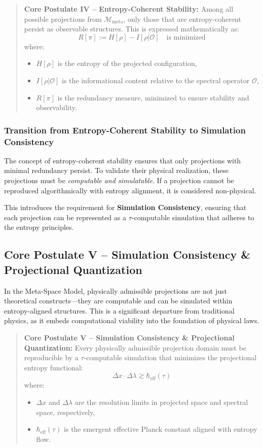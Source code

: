 \documentclass[10.5pt,a4paper]{article}
\begin{document}
\begin{quote}
\textbf{Core Postulate IV – Entropy-Coherent Stability:}  
Among all possible projections from \(\mathcal{M}_{\text{meta}}\), only those that are entropy-coherent persist as observable structures. This is expressed mathematically as:
\[
R[\pi] := H[\rho] - I[\rho | \mathcal{O}] \quad \text{is minimized}
\]
where:
\begin{itemize}
    \item \(H[\rho]\) is the entropy of the projected configuration,
    \item \(I[\rho | \mathcal{O}]\) is the informational content relative to the spectral operator \(\mathcal{O}\),
    \item \(R[\pi]\) is the redundancy measure, minimized to ensure stability and observability.
\end{itemize}
\end{quote}

\subsubsection*{Transition from Entropy-Coherent Stability to Simulation Consistency}

The concept of entropy-coherent stability ensures that only projections with minimal redundancy persist. To validate their physical realization, these projections must be \emph{computable and simulatable}. If a projection cannot be reproduced algorithmically with entropy alignment, it is considered non-physical.

This introduces the requirement for \textbf{Simulation Consistency}, ensuring that each projection can be represented as a \(\tau\)-computable simulation that adheres to the entropy principles.

\subsection{Core Postulate V – Simulation Consistency \& Projectional Quantization}

In the Meta-Space Model, physically admissible projections are not just theoretical constructs—they are computable and can be simulated within entropy-aligned structures. This is a significant departure from traditional physics, as it embeds computational viability into the foundation of physical laws.

\begin{quote}
\textbf{Core Postulate V – Simulation Consistency \& Projectional Quantization:}  
Every physically admissible projection domain must be reproducible by a \(\tau\)-computable simulation that minimizes the projectional entropy functional:
\[
\Delta x \cdot \Delta \lambda \gtrsim \hbar_{\mathrm{eff}}(\tau)
\]
where:
\begin{itemize}
    \item \(\Delta x\) and \(\Delta \lambda\) are the resolution limits in projected space and spectral space, respectively,
    \item \(\hbar_{\mathrm{eff}}(\tau)\) is the emergent effective Planck constant aligned with entropy flow.
\end{itemize}
\end{quote}
\end{document}
